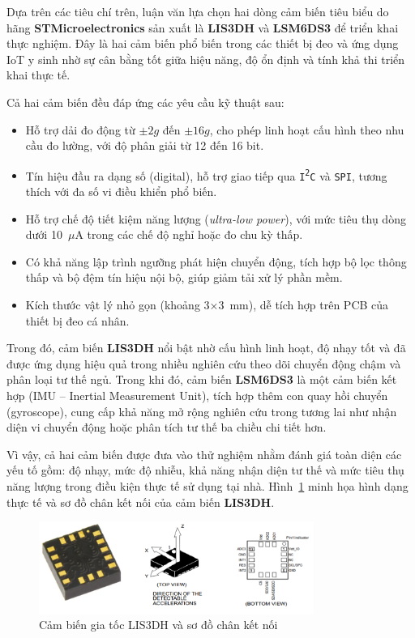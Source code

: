 Dựa trên các tiêu chí trên, luận văn lựa chọn hai dòng cảm biến tiêu biểu do hãng \textbf{STMicroelectronics} sản xuất là \textbf{LIS3DH} và \textbf{LSM6DS3} để triển khai thực nghiệm. Đây là hai cảm biến phổ biến trong các thiết bị đeo và ứng dụng IoT y sinh nhờ sự cân bằng tốt giữa hiệu năng, độ ổn định và tính khả thi triển khai thực tế.

Cả hai cảm biến đều đáp ứng các yêu cầu kỹ thuật sau:

\begin{itemize}
    \item Hỗ trợ dải đo động từ $\pm2g$ đến $\pm16g$, cho phép linh hoạt cấu hình theo nhu cầu đo lường, với độ phân giải từ 12 đến 16 bit.
    \item Tín hiệu đầu ra dạng số (digital), hỗ trợ giao tiếp qua \texttt{I\textsuperscript{2}C} và \texttt{SPI}, tương thích với đa số vi điều khiển phổ biến.
    \item Hỗ trợ chế độ tiết kiệm năng lượng (\textit{ultra-low power}), với mức tiêu thụ dòng dưới 10~$\mu$A trong các chế độ nghỉ hoặc đo chu kỳ thấp.
    \item Có khả năng lập trình ngưỡng phát hiện chuyển động, tích hợp bộ lọc thông thấp và bộ đệm tín hiệu nội bộ, giúp giảm tải xử lý phần mềm.
    \item Kích thước vật lý nhỏ gọn (khoảng 3×3~mm), dễ tích hợp trên PCB của thiết bị đeo cá nhân.
\end{itemize}

Trong đó, cảm biến \textbf{LIS3DH} nổi bật nhờ cấu hình linh hoạt, độ nhạy tốt và đã được ứng dụng hiệu quả trong nhiều nghiên cứu theo dõi chuyển động chậm và phân loại tư thế ngủ. Trong khi đó, cảm biến \textbf{LSM6DS3} là một cảm biến kết hợp (IMU – Inertial Measurement Unit), tích hợp thêm con quay hồi chuyển (gyroscope), cung cấp khả năng mở rộng nghiên cứu trong tương lai như nhận diện vi chuyển động hoặc phân tích tư thế ba chiều chi tiết hơn.

Vì vậy, cả hai cảm biến được đưa vào thử nghiệm nhằm đánh giá 
toàn diện các yếu tố gồm: độ nhạy, mức độ nhiễu, khả năng nhận diện 
tư thế và mức tiêu thụ năng lượng trong điều kiện thực tế sử 
dụng tại nhà. Hình~\ref{lis} minh họa hình dạng thực tế và sơ đồ chân kết nối của cảm biến \textbf{LIS3DH}.

\begin{figure}[htbp]
	\centering
 	\includegraphics[width=0.8\textwidth]{images/lis.png}
	\caption{Cảm biến gia tốc LIS3DH và sơ đồ chân kết nối}
	\label{lis}
\end{figure}


